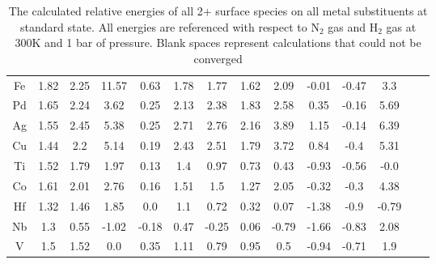 \documentclass{article}
\begin{document}
\begin{table}
\begin{center}
\begin{tabular}{| c | c | c | c | c | c | c | c | c | c | c | c | c | c |}
Fe & 1.82 & 2.25 & 11.57 & 0.63 & 1.78 & 1.77 & 1.62 & 2.09 & -0.01 & -0.47 & 3.3 \\
Pd & 1.65 & 2.24 & 3.62 & 0.25 & 2.13 & 2.38 & 1.83 & 2.58 & 0.35 & -0.16 & 5.69 \\
Ag & 1.55 & 2.45 & 5.38 & 0.25 & 2.71 & 2.76 & 2.16 & 3.89 & 1.15 & -0.14 & 6.39 \\
Cu & 1.44 & 2.2 & 5.14 & 0.19 & 2.43 & 2.51 & 1.79 & 3.72 & 0.84 & -0.4 & 5.31 \\
Ti & 1.52 & 1.79 & 1.97 & 0.13 & 1.4 & 0.97 & 0.73 & 0.43 & -0.93 & -0.56 & -0.0 \\
Co & 1.61 & 2.01 & 2.76 & 0.16 & 1.51 & 1.5 & 1.27 & 2.05 & -0.32 & -0.3 & 4.38 \\
Hf & 1.32 & 1.46 & 1.85 & 0.0 & 1.1 & 0.72 & 0.32 & 0.07 & -1.38 & -0.9 & -0.79 \\
Nb & 1.3 & 0.55 & -1.02 & -0.18 & 0.47 & -0.25 & 0.06 & -0.79 & -1.66 & -0.83 & 2.08 \\
V & 1.5 & 1.52 & 0.0 & 0.35 & 1.11 & 0.79 & 0.95 & 0.5 & -0.94 & -0.71 & 1.9 \\
\hline
\end{tabular}
\end{center}
\caption{The calculated relative energies of all 2+ surface species on all metal substituents at standard state. All energies are referenced with respect to N$_2$ gas and H$_2$ gas at 300K and 1 bar of pressure. Blank spaces represent calculations that could not be converged}
\label{table:energies}
\end{table}
\end{document}
